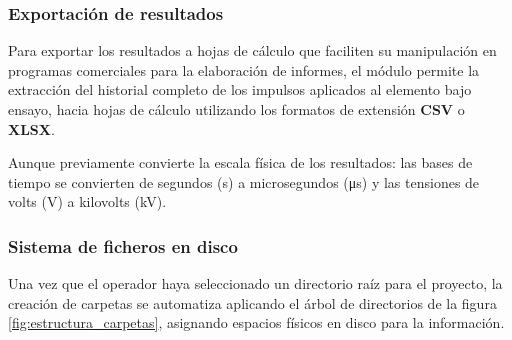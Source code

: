 \subsubsection{Exportación de resultados}
\label{subsubsec:exportar_resultados}

Para exportar los resultados a hojas de cálculo que faciliten su manipulación en programas comerciales para la elaboración de informes, el módulo permite la extracción del historial completo de los impulsos aplicados al elemento bajo ensayo, hacia hojas de cálculo utilizando los formatos de extensión \textbf{CSV} o \textbf{XLSX}.

Aunque previamente convierte la escala física de los resultados: las bases de tiempo se convierten de segundos (\unit{\second}) a microsegundos (\unit{\micro\second}) y las tensiones de volts (\unit{\volt}) a kilovolts (\unit{\kilo\volt}).

\subsubsection{Sistema de ficheros en disco}
\label{subsubsec:estructura_ficheros_disco}

Una vez que el operador haya seleccionado un directorio raíz para el proyecto, la creación de carpetas se automatiza aplicando el árbol de directorios de la figura \ref{fig:estructura_carpetas}, asignando espacios físicos en disco para la información.

